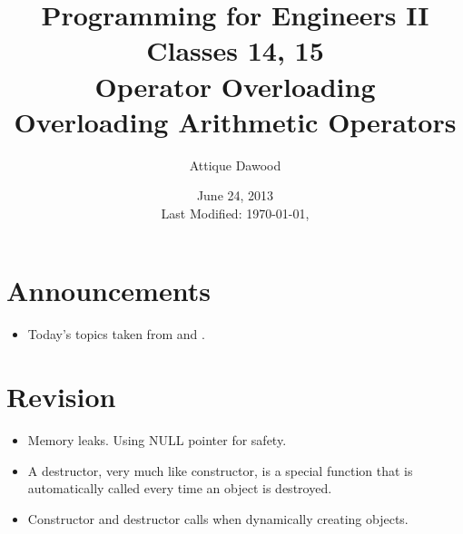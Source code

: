 \documentclass[12pt,a4paper]{article}
\title{\vspace{-2cm}Programming for Engineers II\\Classes 14, 15\\Operator Overloading\\Overloading Arithmetic Operators}
\author{Attique Dawood}
\date{June 24, 2013\\[0.2cm] Last Modified: \today, \currenttime}
\begin{document}
\maketitle
\section{Announcements}
\begin{itemize}
\item Today's topics taken from \cite{Ref:CPP-Copy-Constructor-and-Assignment-Operator} and \cite{Ref:CPP-Operator-Overloading}.
\end{itemize}
\section{Revision}
\begin{itemize}
\item Memory leaks. Using NULL pointer for safety.
\item A destructor, very much like constructor, is a special function that is automatically called every time an object is destroyed.
\item Constructor and destructor calls when dynamically creating objects.
\end{itemize}
\end{document}

